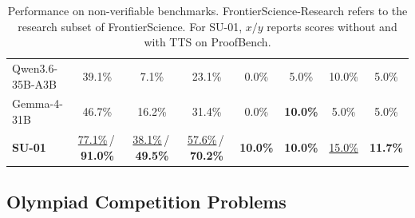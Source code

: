 \documentclass{llmxive}
\begin{document}
\begin{table}[t]
{\begin{tabular}{lccccccc}
Qwen3.6-35B-A3B & 39.1\% & 7.1\% & 23.1\% & 0.0\% & 5.0\% & 10.0\% & 5.0\% \\
Gemma-4-31B & 46.7\% & 16.2\% & 31.4\% & 0.0\% & \textbf{10.0\%} & 5.0\% & 5.0\% \\
\rowcolor{ScienceReasoningBg!35}
\textbf{SU-01} & \underline{77.1\%}\,/\,\textbf{91.0\%} & \underline{38.1\%}\,/\,\textbf{49.5\%} & \underline{57.6\%}\,/\,\textbf{70.2\%} & \textbf{10.0\%} & \textbf{10.0\%} & \underline{15.0\%} & \textbf{11.7\%} \\
\bottomrule
\end{tabular}%
}
\caption{Performance on non-verifiable benchmarks. FrontierScience-Research refers to the research subset of FrontierScience. For SU-01, $x/y$ reports scores without and with TTS on ProofBench.}
\label{tab:nonverifiable-benchmarks}
\end{table}

% 
\subsection{Olympiad Competition Problems}

\end{document}
